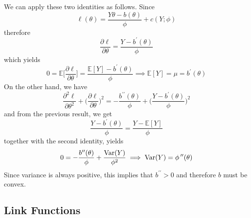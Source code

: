       We can apply these two identities as follows. Since 
      \begin{equation}
        \ell (\theta) = \frac{Y \theta - b(\theta)}{\phi} + c(Y ; \phi)
      \end{equation}
      therefore 
      \begin{equation}
        \frac{\partial \ell}{\partial \theta} = \frac{Y - b^\prime(\theta)}{\phi}
      \end{equation}
      which yields 
      \begin{equation}
        0 = \mathbb{E} \bigg[ \frac{\partial \ell}{\partial \theta} \bigg] = \frac{\mathbb{E}[Y] - b^\prime(\theta)}{\phi} \implies \mathbb{E}[Y] = \mu = b^\prime(\theta)
      \end{equation}
      On the other hand, we have 
      \begin{equation}
        \frac{\partial^2 \ell}{\partial \theta^2} + \bigg( \frac{\partial \ell}{\partial \theta} \bigg)^2 = -\frac{b^{\prime\prime} (\theta)}{\phi} + \bigg(\frac{Y - b^\prime (\theta)}{\phi} \bigg)^2
      \end{equation}
      and from the previous result, we get 
      \begin{equation}
        \frac{Y - b^\prime(\theta)}{\phi} = \frac{Y - \mathbb{E}[Y]}{\phi}
      \end{equation}
      together with the second identity, yields 
      \begin{equation}
        0 = -\frac{b^{\prime\prime}(\theta)}{\phi} + \frac{\operatorname{Var}(Y)}{\phi^2} \implies \operatorname{Var}(Y) = \phi \, ^{\prime\prime} (\theta)
      \end{equation}
      Since variance is always positive, this implies that $b^{\prime\prime} > 0$ and therefore $b$ must be convex. 

\subsection{Link Functions}


